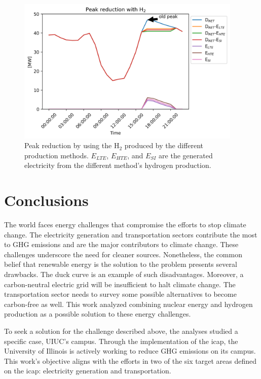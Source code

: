 \begin{figure}[htbp!]
    \centering
	\includegraphics[height=7cm]{figures-hydro/uiuc-hydro3}
	\hfill
	\caption{Peak reduction by using the H$_2$ produced by the different production methods. $E_{LTE}$, $E_{HTE}$, and $E_{SI}$ are the generated electricity from the different method's hydrogen production.}
	\label{fig:uiuc-duck3}
\end{figure}

\section{Conclusions}
\label{sec:hydro-conc}

The world faces energy challenges that compromise the efforts to stop climate change.
The electricity generation and transportation sectors contribute the most to GHG emissions and are the major contributors to climate change.
These challenges underscore the need for cleaner sources.
Nonetheless, the common belief that renewable energy is the solution to the problem presents several drawbacks.
The duck curve is an example of such disadvantages.
Moreover, a carbon-neutral electric grid will be insufficient to halt climate change.
The transportation sector needs to survey some possible alternatives to become carbon-free as well.
This work analyzed combining nuclear energy and hydrogen production as a possible solution to these energy challenges.

To seek a solution for the challenge described above, the analyses studied a specific case, UIUC's campus.
Through the implementation of the \gls{icap}, the University of Illinois is actively working to reduce \gls{GHG} emissions on its campus.
This work's objective aligns with the efforts in two of the six target areas defined on the \gls{icap}: electricity generation and transportation.

